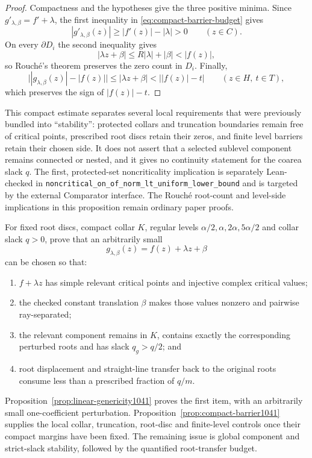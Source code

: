 \begin{proof}
Compactness and the hypotheses give the three positive minima.  Since
$g'_{\lambda,\beta}=f'+\lambda$, the first inequality in
\eqref{eq:compact-barrier-budget} gives
\[
 |g'_{\lambda,\beta}(z)|\ge |f'(z)|-|\lambda|>0
 \qquad(z\in C).
\]
On every $\partial D_i$ the second inequality gives
\[
 |\lambda z+\beta|\le R|\lambda|+|\beta|<|f(z)|,
\]
so Rouch\'e's theorem preserves the zero count in $D_i$.  Finally,
\[
 \bigl||g_{\lambda,\beta}(z)|-|f(z)|\bigr|
 \le |\lambda z+\beta|<\bigl||f(z)|-t\bigr|
 \qquad(z\in H,\ t\in T),
\]
which preserves the sign of $|f(z)|-t$.
\end{proof}

\noindent This compact estimate separates several local requirements that
were previously bundled into ``stability'': protected collars and truncation
boundaries remain free of critical points, prescribed root discs retain their
zeros, and finite level barriers retain their chosen side.  It does not assert
that a selected sublevel component remains connected or nested, and it gives
no continuity statement for the coarea slack $q$.
The first, protected-set noncriticality implication is separately Lean-checked
in \texttt{noncritical\_on\_of\_norm\_lt\_uniform\_lower\_bound} and is
targeted by the external Comparator interface.  The Rouch\'e root-count and
level-side implications in this proposition remain ordinary paper proofs.

\begin{problem}\label{prob:perturb1041}
For fixed root discs, compact collar $K$, regular levels
$\alpha/2,\alpha,2\alpha,5\alpha/2$ and collar slack $q>0$, prove that an
arbitrarily small
\[
 g_{\lambda,\beta}(z)=f(z)+\lambda z+\beta
\]
can be chosen so that:

\begin{enumerate}
\item $f+\lambda z$ has simple relevant critical points and injective complex
critical values;
\item the checked constant translation $\beta$ makes those values nonzero and
pairwise ray-separated;
\item the relevant component remains in $K$, contains exactly the corresponding
perturbed roots and has slack $q_g>q/2$; and
\item root displacement and straight-line transfer back to the original roots
consume less than a prescribed fraction of $q/m$.
\end{enumerate}

Proposition~\ref{prop:linear-genericity1041} proves the first item, with an
arbitrarily small one-coefficient perturbation.  Proposition~\ref{prop:compact-barrier1041}
supplies the local collar, truncation, root-disc and finite-level controls once
their compact margins have been fixed.  The remaining issue is global component
and strict-slack stability, followed by the quantified root-transfer budget.
\end{problem}

